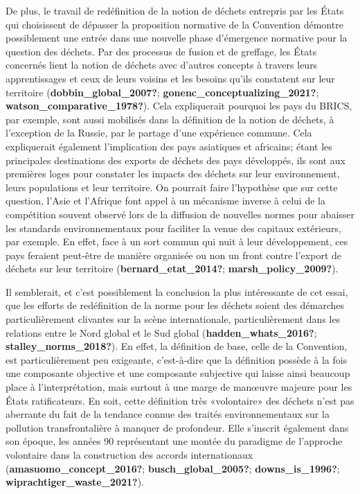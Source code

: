\documentclass[12pt]{ulaval}
\begin{document}
De plus, le travail de redéfinition de la notion de déchets entrepris par les États qui choisissent de dépasser la proposition normative de la Convention démontre possiblement une entrée dans une nouvelle phase d'émergence normative pour la question des déchets. Par des processus de fusion et de greffage, les États concernés lient la notion de déchets avec d'autres concepts à travers leurs apprentissages et ceux de leurs voisins et les besoins qu'ils constatent sur leur territoire (\textbf{dobbin\_global\_2007?}; \textbf{gonenc\_conceptualizing\_2021?}; \textbf{watson\_comparative\_1978?}). Cela expliquerait pourquoi les pays du BRICS, par exemple, sont aussi mobilisés dans la définition de la notion de déchets, à l'exception de la Russie, par le partage d'une expérience commune. Cela expliquerait également l'implication des pays asiatiques et africains; étant les principales destinations des exports de déchets des pays développés, ils sont aux premières loges pour constater les impacts des déchets sur leur environnement, leurs populations et leur territoire. On pourrait faire l'hypothèse que sur cette question, l'Asie et l'Afrique font appel à un mécanisme inverse à celui de la compétition souvent observé lors de la diffusion de nouvelles normes pour abaisser les standards environnementaux pour faciliter la venue des capitaux extérieurs, par exemple. En effet, face à un sort commun qui nuit à leur développement, ces pays feraient peut-être de manière organisée ou non un front contre l'export de déchets sur leur territoire (\textbf{bernard\_etat\_2014?}; \textbf{marsh\_policy\_2009?}).

Il semblerait, et c'est possiblement la conclusion la plus intéressante de cet essai, que les efforts de redéfinition de la norme pour les déchets soient des démarches particulièrement clivantes sur la scène internationale, particulièrement dans les relations entre le Nord global et le Sud global (\textbf{hadden\_whats\_2016?}; \textbf{stalley\_norms\_2018?}). En effet, la définition de base, celle de la Convention, est particulièrement peu exigeante, c'est-à-dire que la définition possède à la fois une composante objective et une composante subjective qui laisse ainsi beaucoup place à l'interprétation, mais surtout à une marge de manœuvre majeure pour les États ratificateurs. En soit, cette définition très «volontaire» des déchets n'est pas aberrante du fait de la tendance connue des traités environnementaux sur la pollution transfrontalière à manquer de profondeur. Elle s'inscrit également dans son époque, les années 90 représentant une montée du paradigme de l'approche volontaire dans la construction des accords internationaux (\textbf{amasuomo\_concept\_2016?}; \textbf{busch\_global\_2005?}; \textbf{downs\_is\_1996?}; \textbf{wiprachtiger\_waste\_2021?}).
\end{document}
